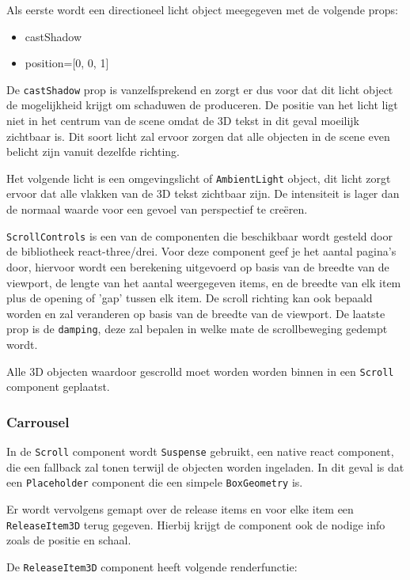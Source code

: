 Als eerste wordt een directioneel licht object meegegeven met de volgende props:

\begin{itemize}
	\item castShadow
	\item position={[0, 0, 1]}
\end{itemize}

De \texttt{castShadow} prop is vanzelfsprekend en zorgt er dus voor dat dit licht object de mogelijkheid krijgt om schaduwen de produceren. De positie van het licht ligt niet in het centrum van de scene omdat de 3D tekst in dit geval moeilijk zichtbaar is. Dit soort licht zal ervoor zorgen dat alle objecten in de scene even belicht zijn vanuit dezelfde richting.

Het volgende licht is een omgevingslicht of \texttt{AmbientLight} object, dit licht zorgt ervoor dat alle vlakken van de 3D tekst zichtbaar zijn. De intensiteit is lager dan de normaal waarde voor een gevoel van perspectief te creëren.

\texttt{ScrollControls} is een van de componenten die beschikbaar wordt gesteld door de bibliotheek react-three/drei. Voor deze component geef je het aantal pagina's door, hiervoor wordt een berekening uitgevoerd op basis van de breedte van de viewport, de lengte van het aantal weergegeven items, en de breedte van elk item plus de opening of 'gap' tussen elk item. De scroll richting kan ook bepaald worden en zal veranderen op basis van de breedte van de viewport. De laatste prop is de \texttt{damping}, deze zal bepalen in welke mate de scrollbeweging gedempt wordt.

Alle 3D objecten waardoor gescrolld moet worden worden binnen in een \texttt{Scroll} component geplaatst.

\subsubsection{Carrousel}

In de \texttt{Scroll} component wordt \texttt{Suspense} gebruikt, een native react component, die een fallback zal tonen terwijl de objecten worden ingeladen. In dit geval is dat een \texttt{Placeholder} component die een simpele \texttt{BoxGeometry} is.

Er wordt vervolgens gemapt over de release items en voor elke item een \texttt{ReleaseItem3D} terug gegeven. Hierbij krijgt de component ook de nodige info zoals de positie en schaal.

De \texttt{ReleaseItem3D} component heeft volgende renderfunctie:

